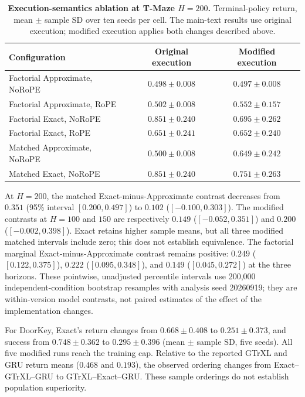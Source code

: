 \begin{table}[htbp]
\centering
\small
\caption{\textbf{Execution-semantics ablation at T-Maze $H=200$.}
Terminal-policy return, mean $\pm$ sample SD over ten seeds per cell.
The main-text results use original execution; modified execution applies both
changes described above.}
\label{tab:execution_sensitivity}
\begin{tabular}{lcc}
\toprule
Configuration & Original execution & Modified execution \\
\midrule
Factorial Approximate, NoRoPE & $0.498 \pm 0.008$ & $0.497 \pm 0.008$ \\
Factorial Approximate, RoPE & $0.502 \pm 0.008$ & $0.552 \pm 0.157$ \\
Factorial Exact, NoRoPE & $0.851 \pm 0.240$ & $0.695 \pm 0.262$ \\
Factorial Exact, RoPE & $0.651 \pm 0.241$ & $0.652 \pm 0.240$ \\
Matched Approximate, NoRoPE & $0.500 \pm 0.008$ & $0.649 \pm 0.242$ \\
Matched Exact, NoRoPE & $0.851 \pm 0.240$ & $0.751 \pm 0.263$ \\
\bottomrule
\end{tabular}
\end{table}

At $H=200$, the matched Exact-minus-Approximate contrast decreases from
$0.351$ (95\% interval $[0.200,0.497]$) to $0.102$ ($[-0.100,0.303]$).
The modified contrasts at $H=100$ and $150$ are respectively $0.149$
($[-0.052,0.351]$) and $0.200$ ($[-0.002,0.398]$). Exact retains higher
sample means, but all three modified matched intervals include zero; this does
not establish equivalence. The factorial marginal Exact-minus-Approximate
contrast remains positive: $0.249$ ($[0.122,0.375]$), $0.222$
($[0.095,0.348]$), and $0.149$ ($[0.045,0.272]$) at the three horizons.
These pointwise, unadjusted percentile intervals use 200,000 independent-condition
bootstrap resamples with analysis seed 20260919; they are within-version model
contrasts, not paired estimates of the effect of the implementation changes.

For DoorKey, Exact's return changes from $0.668\pm0.408$ to
$0.251\pm0.373$, and success from $0.748\pm0.362$ to $0.295\pm0.396$
(mean $\pm$ sample SD, five seeds). All five modified runs reach the training
cap. Relative to the reported GTrXL and GRU return means ($0.468$ and $0.193$),
the observed ordering changes from Exact--GTrXL--GRU to GTrXL--Exact--GRU.
These sample orderings do not establish population superiority.


